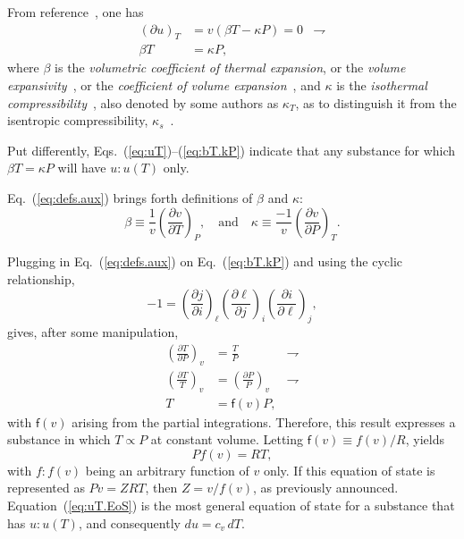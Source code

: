 \documentclass[fleqn,11pt]{SelfArx}
\newcommand{\parxyz}[3]{\left(\frac{\partial {{#1}}}{\partial {{#2}}}\right)_{\!\!\!{#3}}}
\newcommand{\bri}[2]{(\partial {{#1}})_{{#2}}}
\begin{document}
    From reference~\cite{2006-BejanA-Wiley}, one has
    \begin{align}
        \bri uT & = v(\beta T - \kappa P) = 0 & \rightharpoondown \\
        \beta T & = \kappa P,
        \label{eq:bT.kP}
    \end{align}
    \noindent where $\beta$ is the \emph{volumetric coefficient of thermal  expansion},  or  the
    \emph{volume  expansivity}~\cite{2006-BejanA-Wiley},  or  the  \emph{coefficient  of  volume
    expansion}~\cite{1986-JonesJB+HawkinsGA-Wiley},  and  $\kappa$   is   the   \emph{isothermal
    compressibility}~\cite{2006-BejanA-Wiley}, also denoted by some authors as $\kappa_T$, as to
    distinguish         it         from         the         isentropic          compressibility,
    $\kappa_s$~\cite{1986-JonesJB+HawkinsGA-Wiley}.

    Put differently, Eqs.~(\ref{eq:uT})--(\ref{eq:bT.kP}) indicate that any substance for  which
    $\beta T = \kappa P$ will have $u\!:\!u(T)$ only.

    Eq.~(\ref{eq:defs.aux}) brings forth definitions of $\beta$ and $\kappa$:
    \begin{equation}
        \beta  \equiv \frac{1}{v}\parxyz vTP, \quad\mbox{and}\quad
        \kappa \equiv \frac{-1}{v}\parxyz vPT.
        \label{eq:defs.aux}
    \end{equation}

    Plugging  in  Eq.~(\ref{eq:defs.aux})  on  Eq.~(\ref{eq:bT.kP})   and   using   the   cyclic
    relationship,
    \begin{equation}
        -1 = \parxyz ji\ell \parxyz\ell ji \parxyz i\ell j,
        \label{eq:cyclic}
    \end{equation}
    \noindent gives, after some manipulation,
    \begin{align}
        \parxyz TPv & = \frac{T}{P} & \rightharpoondown \\
        \left(\frac{\partial T}{T}\right)_{\!\!\!v} & =
            \left(\frac{\partial P}{P}\right)_{\!\!\!v} & \rightharpoondown \\
        T & = \mathsf{f}(v)P,
        \label{eq:uT.TPv}
    \end{align}
    \noindent with $\mathsf{f}(v)$ arising from the partial integrations. Therefore, this result
    expresses a substance in which $T \propto P$  at  constant  volume.  Letting  $\mathsf{f}(v)
    \equiv f(v)/R$, yields
    \begin{equation}
        Pf(v) = RT,
        \label{eq:uT.EoS}
    \end{equation}
    \noindent with $f\!:\!f(v)$ being an arbitrary function of $v$ only.  If  this  equation  of
    state  is  represented  as  $Pv  =  ZRT$,  then  $Z  =  v/f(v)$,  as  previously  announced.
    Equation~(\ref{eq:uT.EoS}) is the most general equation of state for a  substance  that  has
    $u\!:\!u(T)$, and consequently $du = c_v\,dT$.
\end{document}
